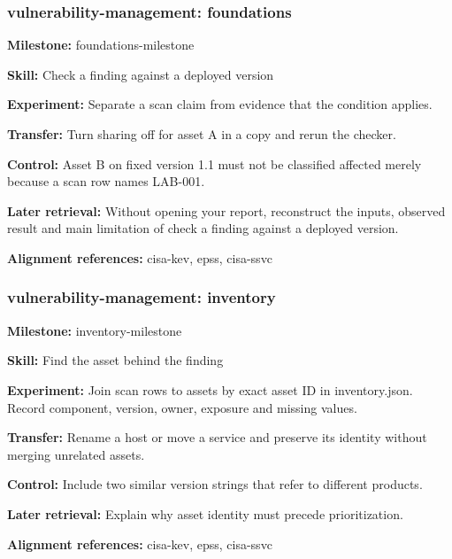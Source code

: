\subsubsection{vulnerability-management: foundations}
\noindent\textbf{Milestone:} foundations-milestone\par
\noindent\textbf{Skill:} Check a finding against a deployed version\par
\noindent\textbf{Experiment:} Separate a scan claim from evidence that the condition applies.\par
\noindent\textbf{Transfer:} Turn sharing off for asset A in a copy and rerun the checker.\par
\noindent\textbf{Control:} Asset B on fixed version 1.1 must not be classified affected merely because a scan row names LAB-001.\par
\noindent\textbf{Later retrieval:} Without opening your report, reconstruct the inputs, observed result and main limitation of check a finding against a deployed version.\par
\noindent\textbf{Alignment references:} cisa-kev, epss, cisa-ssvc\par
\subsubsection{vulnerability-management: inventory}
\noindent\textbf{Milestone:} inventory-milestone\par
\noindent\textbf{Skill:} Find the asset behind the finding\par
\noindent\textbf{Experiment:} Join scan rows to assets by exact asset ID in inventory.json. Record component, version, owner, exposure and missing values.\par
\noindent\textbf{Transfer:} Rename a host or move a service and preserve its identity without merging unrelated assets.\par
\noindent\textbf{Control:} Include two similar version strings that refer to different products.\par
\noindent\textbf{Later retrieval:} Explain why asset identity must precede prioritization.\par
\noindent\textbf{Alignment references:} cisa-kev, epss, cisa-ssvc\par

